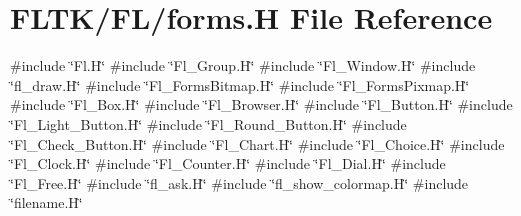 \hypertarget{forms_8_h}{}\section{F\+L\+T\+K/\+F\+L/forms.H File Reference}
\label{forms_8_h}
{\ttfamily \#include \char`\"{}Fl.\+H\char`\"{}}\newline
{\ttfamily \#include \char`\"{}Fl\+\_\+\+Group.\+H\char`\"{}}\newline
{\ttfamily \#include \char`\"{}Fl\+\_\+\+Window.\+H\char`\"{}}\newline
{\ttfamily \#include \char`\"{}fl\+\_\+draw.\+H\char`\"{}}\newline
{\ttfamily \#include \char`\"{}Fl\+\_\+\+Forms\+Bitmap.\+H\char`\"{}}\newline
{\ttfamily \#include \char`\"{}Fl\+\_\+\+Forms\+Pixmap.\+H\char`\"{}}\newline
{\ttfamily \#include \char`\"{}Fl\+\_\+\+Box.\+H\char`\"{}}\newline
{\ttfamily \#include \char`\"{}Fl\+\_\+\+Browser.\+H\char`\"{}}\newline
{\ttfamily \#include \char`\"{}Fl\+\_\+\+Button.\+H\char`\"{}}\newline
{\ttfamily \#include \char`\"{}Fl\+\_\+\+Light\+\_\+\+Button.\+H\char`\"{}}\newline
{\ttfamily \#include \char`\"{}Fl\+\_\+\+Round\+\_\+\+Button.\+H\char`\"{}}\newline
{\ttfamily \#include \char`\"{}Fl\+\_\+\+Check\+\_\+\+Button.\+H\char`\"{}}\newline
{\ttfamily \#include \char`\"{}Fl\+\_\+\+Chart.\+H\char`\"{}}\newline
{\ttfamily \#include \char`\"{}Fl\+\_\+\+Choice.\+H\char`\"{}}\newline
{\ttfamily \#include \char`\"{}Fl\+\_\+\+Clock.\+H\char`\"{}}\newline
{\ttfamily \#include \char`\"{}Fl\+\_\+\+Counter.\+H\char`\"{}}\newline
{\ttfamily \#include \char`\"{}Fl\+\_\+\+Dial.\+H\char`\"{}}\newline
{\ttfamily \#include \char`\"{}Fl\+\_\+\+Free.\+H\char`\"{}}\newline
{\ttfamily \#include \char`\"{}fl\+\_\+ask.\+H\char`\"{}}\newline
{\ttfamily \#include \char`\"{}fl\+\_\+show\+\_\+colormap.\+H\char`\"{}}\newline
{\ttfamily \#include \char`\"{}filename.\+H\char`\"{}}\newline
